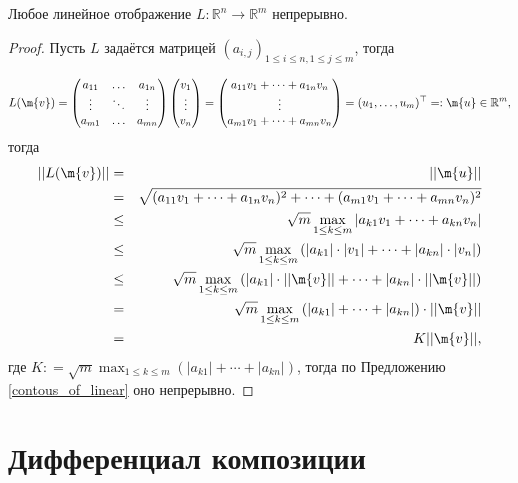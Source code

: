 \begin{lemma}\label{linear_is_contious}
    Любое линейное отображение $L: \mathbb{R}^n \to \mathbb{R}^m$ непрерывно. 
\end{lemma}
\begin{proof}
Пусть $L$ задаётся матрицей $(a_{i,j})_{1\le i \le n, 1 \le j \le m}$, тогда

\[
 L(\m{v}) = \begin{pmatrix}
     a_{11} & \ldots & a_{1n} \\
     \vdots & \ddots & \vdots \\
     a_{m1} & \ldots & a_{mn}
 \end{pmatrix}   \begin{pmatrix}
     v_1 \\ \vdots \\ v_n
 \end{pmatrix} = \begin{pmatrix}
     a_{11}v_1 + \cdots + a_{1n}v_n \\
     \vdots \\
     a_{m1}v_1 + \cdots + a_{mn}v_n 
 \end{pmatrix} = (u_1, \ldots, u_m)^\top =:\m{u} \in \mathbb{R}^m,
\] 
тогда
\begin{eqnarray*}
    ||L(\m{v})|| &=& ||\m{u}|| \\
    &=& \sqrt{(a_{11}v_1 + \cdots + a_{1n}v_n)^2 + \cdots + (a_{m1}v_1 + \cdots + a_{mn}v_n)^2} \\
    &\le & \sqrt{ m } \max_{1 \le k \le m} \left| a_{k1}v_1 + \cdots + a_{kn}v_n  \right| \\
    &\le & \sqrt{ m } \max_{1 \le k \le m} \left( |a_{k1}| \cdot |v_1| + \cdots + |a_{kn}| \cdot |v_n| \right) \\
    &\le & \sqrt{ m } \max_{1 \le k \le m} \left(|a_{k1}| \cdot || \m{v}|| + \cdots + |a_{kn}| \cdot || \m{v}||  \right) \\
    &=& \sqrt{ m } \max_{1 \le k \le m}\left(|a_{k1}|  + \cdots + |a_{kn}|   \right) \cdot || \m{v}|| \\
    &=& K || \m{v}||,
\end{eqnarray*}
где $K: = \sqrt{ m } \max_{1 \le k \le m}\left(|a_{k1}|  + \cdots + |a_{kn}|   \right)$, тогда по Предложению \ref{contous_of_linear} оно непрерывно. 
\end{proof}

\section{Дифференциал композиции}




